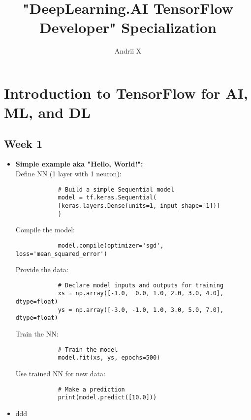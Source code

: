 \documentclass[16pt]{article}
\title{"DeepLearning.AI TensorFlow Developer" Specialization }
\author{ Andrii X }
\date{}
\begin{document}
	\maketitle
	
	\section{Introduction to TensorFlow for AI, ML, and DL}
	\subsection{Week 1}
	\begin{itemize}
		
		\item \textbf{Simple example aka "Hello, World!":}
		\\
		Define NN (1 layer with 1 neuron):
		\begin{verbatim}
			# Build a simple Sequential model
			model = tf.keras.Sequential(
			[keras.layers.Dense(units=1, input_shape=[1])]
			)
		\end{verbatim}
		Compile the model:
		\begin{verbatim}
			model.compile(optimizer='sgd', loss='mean_squared_error')
		\end{verbatim}
		Provide the data:
		\begin{verbatim}
			# Declare model inputs and outputs for training
			xs = np.array([-1.0,  0.0, 1.0, 2.0, 3.0, 4.0], dtype=float)
			ys = np.array([-3.0, -1.0, 1.0, 3.0, 5.0, 7.0], dtype=float)	
		\end{verbatim}
		Train the NN:
		\begin{verbatim}
			# Train the model
			model.fit(xs, ys, epochs=500)	
		\end{verbatim}
		Use trained NN for new data:
		\begin{verbatim}
			# Make a prediction
			print(model.predict([10.0]))	
		\end{verbatim}
		\item ddd
	
	\end{itemize}
	
	
\end{document}
